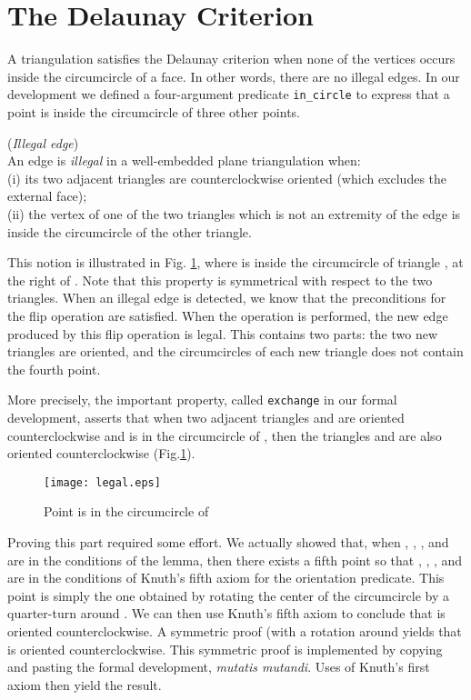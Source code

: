 \documentclass{llncs}
\begin{document}
\section{The Delaunay Criterion}
\label{DP}
A triangulation satisfies the Delaunay criterion when none of the
vertices occurs inside the circumcircle of a face.  In other words, there
are no illegal edges.  In our development we defined a four-argument predicate
 {\tt in\_circle} to express that a point is inside the circumcircle of
three other points.

\begin{definition}({\em Illegal edge}) 
\label{Il}\\
An edge is {\em illegal} in a well-embedded plane triangulation when:\\
(i) its two adjacent triangles are counterclockwise oriented 
(which excludes the external face); \\
(ii) the vertex of one of the two triangles which is not an extremity of the
edge is inside the circumcircle of the other triangle.
\end{definition}

This notion is illustrated in Fig. \ref{fig:legal}, where 
is inside the circumcircle of triangle , at the right
of .  Note that this property is symmetrical with respect to
the two triangles.  When an illegal edge is detected, we know that the
preconditions for the flip operation are satisfied.  When the operation is performed, the new edge produced by this flip operation is
legal.  This contains two parts: the two new triangles are oriented, and
the circumcircles of each new triangle does not contain the fourth point.

More precisely, the important property, called {\tt exchange} in our
formal development, asserts that when two adjacent triangles 
and  are oriented counterclockwise and  is in the
circumcircle of , then the triangles  and 
are also oriented counterclockwise (Fig.\ref{fig:legal}).

\begin{figure}
\begin{center}
\texttt{[image: legal.eps]}
\end{center}
\caption{Point  is in the circumcircle of }
\label{fig:legal}
\end{figure}

Proving this part required some effort.  We actually showed that, when
, , , and  are in the conditions of the lemma,
then there exists a fifth point  so that ,  , ,
and  are in the conditions of Knuth's fifth axiom for the 
orientation predicate.  This point is simply the one obtained by rotating
the center of the circumcircle by a quarter-turn around .  We can then
use Knuth's fifth axiom to conclude that  is oriented counterclockwise.
A symmetric proof (with a rotation around  yields that  is
oriented counterclockwise.  This symmetric proof is implemented by
copying and pasting the formal development, {\sl mutatis mutandi}.  Uses
of Knuth's first axiom then yield the result.
\end{document}
